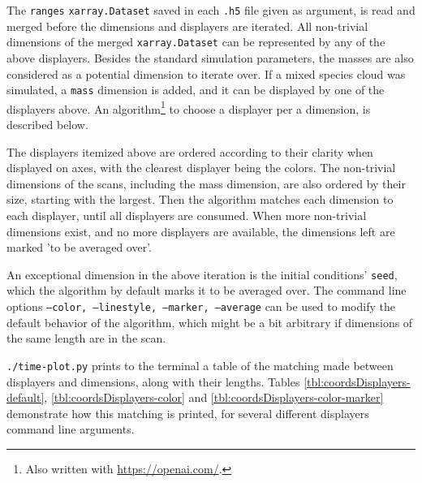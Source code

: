 The \texttt{ranges} \texttt{xarray.Dataset} saved in each \texttt{.h5} file given as argument, is read and merged before the dimensions and displayers are iterated. All non-trivial dimensions of the merged \texttt{xarray.Dataset} can be represented by any of the above displayers. Besides the standard simulation parameters, the masses are also considered as a potential dimension to iterate over. If a mixed species cloud was simulated, a \texttt{mass} dimension is added, and it can be displayed by one of the displayers above. An algorithm\footnote{Also written with \url{https://openai.com/}.} to choose a displayer per a dimension, is described below.

The displayers itemized above are ordered according to their clarity when displayed on axes, with the clearest displayer being the colors. The non-trivial dimensions of the scans, including the mass dimension, are also ordered by their size, starting with the largest. Then the algorithm matches each dimension to each displayer, until all displayers are consumed. When more non-trivial dimensions exist, and no more displayers are available, the dimensions left are marked 'to be averaged over'.

An exceptional dimension in the above iteration is the initial conditions' \texttt{seed}, which the algorithm by default marks it to be averaged over. The command line options \texttt{--color, --linestyle, --marker, --average} can be used to modify the default behavior of the algorithm, which might be a bit arbitrary if dimensions of the same length are in the scan.

\texttt{./time-plot.py} prints to the terminal a table of the matching made between displayers and dimensions, along with their lengths. Tables \ref{tbl:coordsDisplayers-default}, \ref{tbl:coordsDisplayers-color} and \ref{tbl:coordsDisplayers-color-marker} demonstrate how this matching is printed, for several different displayers command line arguments.

\begin{table}[h]

\caption{The default match made by the plotting scripts between displayers and \texttt{xarray.Dataset} dimensions, for a scan with only 1 mass.}
\label{tbl:coordsDisplayers-default}
\end{table}

\begin{table}[h]

\caption{The dimensions-displayers match for the same \texttt{.h5} files as in \ref{tbl:coordsDisplayers-default}, but when \texttt{--color omega} was given.}
\label{tbl:coordsDisplayers-color}
\end{table}

